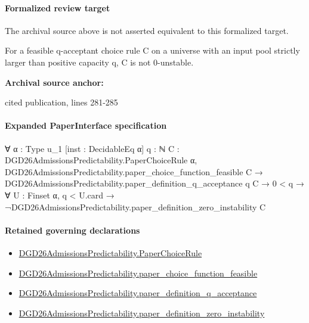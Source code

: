 \documentclass[10pt]{article}
\begin{document}
\paragraph{Formalized review target}
The archival source above is not asserted equivalent to this formalized target.
\begin{ReviewVerbatim}
For a feasible q-acceptant choice rule C on a universe with an input pool strictly larger than positive capacity q, C is not 0-unstable.
\end{ReviewVerbatim}

\textbf{Archival source anchor:} {\footnotesize\raggedright cited publication, lines 281-\allowbreak{}285\par}
\paragraph{Expanded PaperInterface specification}
\begin{ReviewVerbatim}
∀ {α : Type u_1} [inst : DecidableEq α] {q : ℕ} {C : DGD26AdmissionsPredictability.PaperChoiceRule α},
  DGD26AdmissionsPredictability.paper_choice_function_feasible C →
    DGD26AdmissionsPredictability.paper_definition_q_acceptance q C →
      0 < q → ∀ {U : Finset α}, q < U.card → ¬DGD26AdmissionsPredictability.paper_definition_zero_instability C
\end{ReviewVerbatim}

\paragraph{Retained governing declarations}
\begin{itemize}\raggedright
\item \hyperlink{governing-declaration-4678951b4432b184}{DGD26\allowbreak{}Admissions\allowbreak{}Predictability.\allowbreak{}Paper\allowbreak{}Choice\allowbreak{}Rule}
\item \hyperlink{governing-declaration-f7de74a44053f6d5}{DGD26\allowbreak{}Admissions\allowbreak{}Predictability.\allowbreak{}paper\_\allowbreak{}choice\_\allowbreak{}function\_\allowbreak{}feasible}
\item \hyperlink{governing-declaration-7ecd62274fb2f391}{DGD26\allowbreak{}Admissions\allowbreak{}Predictability.\allowbreak{}paper\_\allowbreak{}definition\_\allowbreak{}q\_\allowbreak{}acceptance}
\item \hyperlink{governing-declaration-c23ecf0aa84721c4}{DGD26\allowbreak{}Admissions\allowbreak{}Predictability.\allowbreak{}paper\_\allowbreak{}definition\_\allowbreak{}zero\_\allowbreak{}instability}
\end{itemize}
\end{document}
